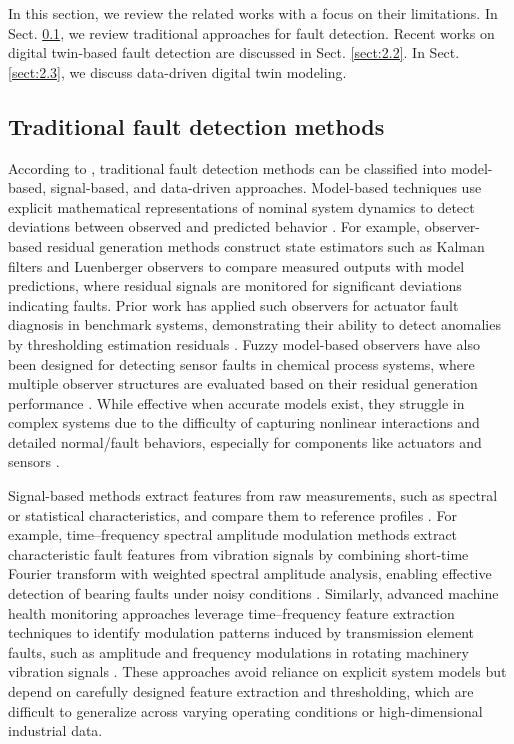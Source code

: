 \documentclass[a4paper,10pt]{cas-sc}%
\newcommand{\rev}[1]{\textcolor{revisionred}{#1}}
\begin{document}
In this section, we review the related works with a focus on their limitations. In Sect. \ref{sec:2.1}, we review traditional approaches for \rev{fault detection}. Recent works on digital twin-based fault detection are discussed in Sect. \ref{sect:2.2}. In Sect. \ref{sect:2.3}, \rev{we} discuss data-driven digital twin modeling.

\subsection{Traditional fault detection methods}\label{sec:2.1}

According to \citep{9529495, leite2024fault}, traditional fault detection methods can be classified into model-based, signal-based, and data-driven approaches. Model-based techniques use explicit mathematical representations of nominal system dynamics to detect deviations between observed and predicted behavior \citep{ISERMANN1997709, marzat2012model}. For example, observer-based residual generation methods construct state estimators such as Kalman filters and Luenberger observers to compare measured outputs with model predictions, where residual signals are monitored for significant deviations indicating faults. Prior work has applied such observers for actuator fault diagnosis in benchmark systems, demonstrating their ability to detect anomalies by thresholding estimation residuals \citep{Zemali2023}. Fuzzy model-based observers have also been designed for detecting sensor faults in chemical process systems, where multiple observer structures are evaluated based on their residual generation performance \citep{BALLESTEROSMONCADA2015325}. While effective when accurate models exist, they struggle in complex systems due to the difficulty of capturing nonlinear interactions and detailed normal/fault behaviors, especially for components like actuators and sensors \citep{JUNG2019285}.

Signal-based methods extract features from raw measurements, such as spectral or statistical characteristics, and compare them to reference profiles \citep{aiorduachioaie2024comparative, wu2019survey}. For example, time--frequency spectral amplitude modulation methods extract characteristic fault features from vibration signals by combining short-time Fourier transform with weighted spectral amplitude analysis, enabling effective detection of bearing faults under noisy conditions \citep{JIANG2023109832}. Similarly, advanced machine health monitoring approaches leverage time--frequency feature extraction techniques to identify modulation patterns induced by transmission element faults, such as amplitude and frequency modulations in rotating machinery vibration signals \citep{ZHOU2023110489}. These approaches avoid reliance on explicit system models but depend on carefully designed feature extraction and thresholding, which are difficult to generalize across varying operating conditions or high-dimensional industrial data. 
\end{document}

